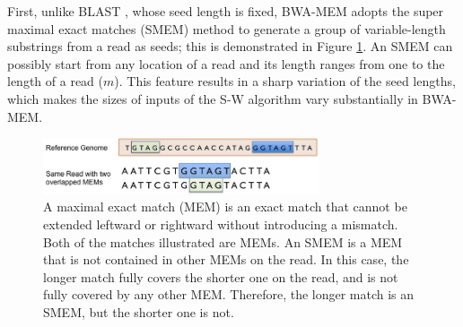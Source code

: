 First, unlike BLAST \cite{BLAST1990}, whose seed length is fixed, BWA-MEM adopts the super maximal exact matches (SMEM) method \cite{Heng2012} to generate
a group of variable-length substrings from a read as seeds; this is demonstrated in Figure \ref{fig:F1C2}. 
An SMEM can possibly start from any location of a read and its length ranges from one to the length of a read ($m$). 
This feature results in a sharp variation of the seed lengths, which makes the sizes of inputs of the S-W algorithm vary substantially in BWA-MEM.

\begin{figure}[!hbt]
	\begin{center}
		\includegraphics[width=3.2in]{Figures/Figure1C2.jpg}
		\caption {A maximal exact match (MEM) is an exact match that cannot be extended leftward or rightward without introducing a mismatch. Both of the matches illustrated are MEMs. An SMEM is a MEM that is not contained in other MEMs on the read. In this case, the longer match fully covers the shorter one on the read, and is not fully covered by any other MEM. Therefore, the longer match is an SMEM, but the shorter one is not.}
		\label{fig:F1C2}
	\end{center}
\end{figure}


